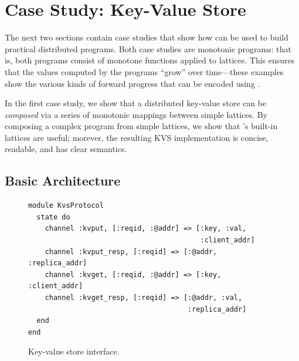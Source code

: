 \section{Case Study: Key-Value Store}
\label{sec:kvs}
The next two sections contain case studies that show how \lang can be used to
build practical distributed programs. Both case studies are monotonic programs:
that is, both programs consist of monotone functions applied to lattices. This
ensures that the values computed by the programs ``grow'' over time---these
examples show the various kinds of forward progress that can be encoded using
\lang.

In the first case study, we show that a distributed key-value store can be
\emph{composed} via a series of monotonic mappings between simple lattices. By
composing a complex program from simple lattices, we show that \lang's built-in
lattices are useful; morever, the resulting KVS implementation is concise,
readable, and has clear semantics.




\subsection{Basic Architecture}
\begin{figure}[t]
\begin{scriptsize}
\begin{lstlisting}
module KvsProtocol
  state do
    channel :kvput, [:reqid, :@addr] => [:key, :val,
                                         :client_addr]
    channel :kvput_resp, [:reqid] => [:@addr, :replica_addr]
    channel :kvget, [:reqid, :@addr] => [:key, :client_addr]
    channel :kvget_resp, [:reqid] => [:@addr, :val,
                                      :replica_addr]
  end
end
\end{lstlisting}
\end{scriptsize}
\caption{Key-value store interface.}
\label{fig:kvs-interface}
\end{figure}

